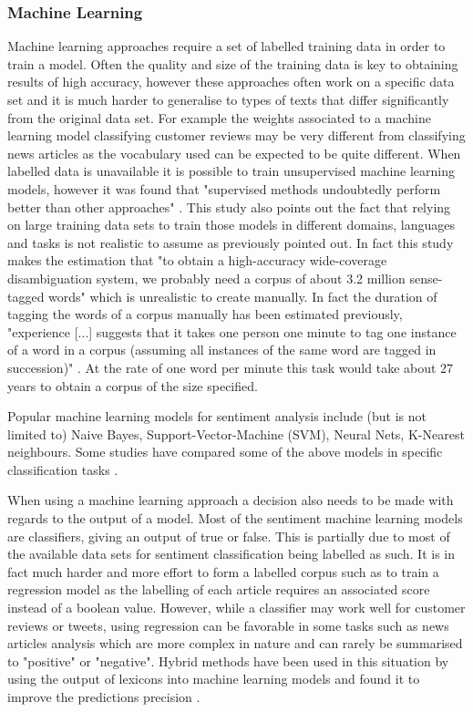 \subsubsection{Machine Learning}

Machine learning approaches require a set of labelled training data in order to train a model. Often the quality and size of the training data is key to obtaining results of high accuracy, however these approaches often work on a specific data set and it is much harder to generalise to types of texts that differ significantly from the original data set. For example the weights associated to a machine learning model classifying customer reviews may be very different from classifying news articles as the vocabulary used can be expected to be quite different. When labelled data is unavailable it is possible to train unsupervised machine learning models, however it was found that "supervised methods undoubtedly perform better than other approaches" \citep{navigli2009word}. This study also points out the fact that relying on large training data sets to train those models in different domains, languages and tasks is not realistic to assume as previously pointed out. In fact this study makes the estimation that "to obtain a high-accuracy wide-coverage disambiguation system, we probably need a corpus of about 3.2 million sense-tagged words" which is unrealistic to create manually. In fact the duration of tagging the words of a corpus manually has been estimated previously, "experience [...] suggests that it takes one person one minute to tag one instance of
a word in a corpus (assuming all instances of the same word are tagged in succession)" \citep{do2000designing}. At the rate of one word per minute this task would take about 27 years to obtain a corpus of the size specified.

Popular machine learning models for sentiment analysis include (but is not limited to) Naive Bayes, Support-Vector-Machine (SVM), Neural Nets, K-Nearest neighbours. Some studies have compared some of the above models in specific classification tasks \citep{wawre2016sentiment,ye2009sentiment,seo2020comparative}.

When using a machine learning approach a decision also needs to be made with regards to the output of a model. Most of the sentiment machine learning models are classifiers, giving an output of true or false. This is partially due to most of the available data sets for sentiment classification being labelled as such. It is in fact much harder and more effort to form a labelled corpus such as to train a regression model as the labelling of each article requires an associated score instead of a boolean value. However, while a classifier may work well for customer reviews or tweets, using regression can be favorable in some tasks such as news articles analysis which are more complex in nature and can rarely be summarised to "positive" or "negative". Hybrid methods have been used in this situation by using the output of lexicons into machine learning models and found it to improve the predictions precision \citep{kolchyna2015twitter}.

